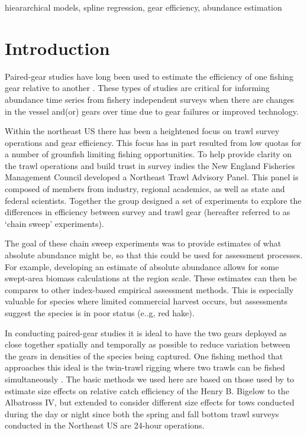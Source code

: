 \documentclass[]{article}
\begin{document}
hieararchical models, spline regression, gear efficiency, abundance
estimation

\pagebreak

\hypertarget{introduction}{%
\section{Introduction}\label{introduction}}

Paired-gear studies have long been used to estimate the efficiency of
one fishing gear relative to another
\citep[e.g.,][]{gulland64,bourne65}. These types of studies are critical
for informing abundance time series from fishery independent surveys
when there are changes in the vessel and(or) gears over time due to gear
failures or improved technology.

Within the northeast US there has been a heightened focus on trawl
survey operations and gear efficiency. This focus has in part resulted
from low quotas for a number of grounfish limiting fishing
opportunities. To help provide clarity on the trawl operations and build
trust in survey indies the New England Fisheries Management Council
developed a Northeast Trawl Advisory Panel. This panel is composed of
members from industry, regional academics, as well as state and federal
scientists. Together the group designed a set of experiments to explore
the differences in efficiency between survey and trawl gear (hereafter
referred to as `chain sweep' experiments).

The goal of these chain sweep experiments was to provide estimates of
what absolute abundance might be, so that this could be used for
assessment processes. For example, developing an estimate of absolute
abundance allows for some swept-area biomass calculations at the region
scale. These estimates can then be compares to other index-based
empirical assessment methods. This is especially valuable for species
where limited commercial harvest occurs, but assessments suggest the
species is in poor status (e..g, red hake).

In conducting paired-gear studies it is ideal to have the two gears
deployed as close together spatially and temporally as possible to
reduce variation between the gears in densities of the species being
captured. One fishing method that approaches this ideal is the
twin-trawl rigging where two trawls can be fished simultaneously
\citep{ices96}. The basic methods we used here are based on those used
by \citet{miller13} to estimate size effects on relative catch
efficiency of the Henry B. Bigelow to the Albatrosss IV, but extended to
consider different size effects for tows conducted during the day or
night since both the spring and fall bottom trawl surveys conducted in
the Northeast US are 24-hour operations.
\end{document}
